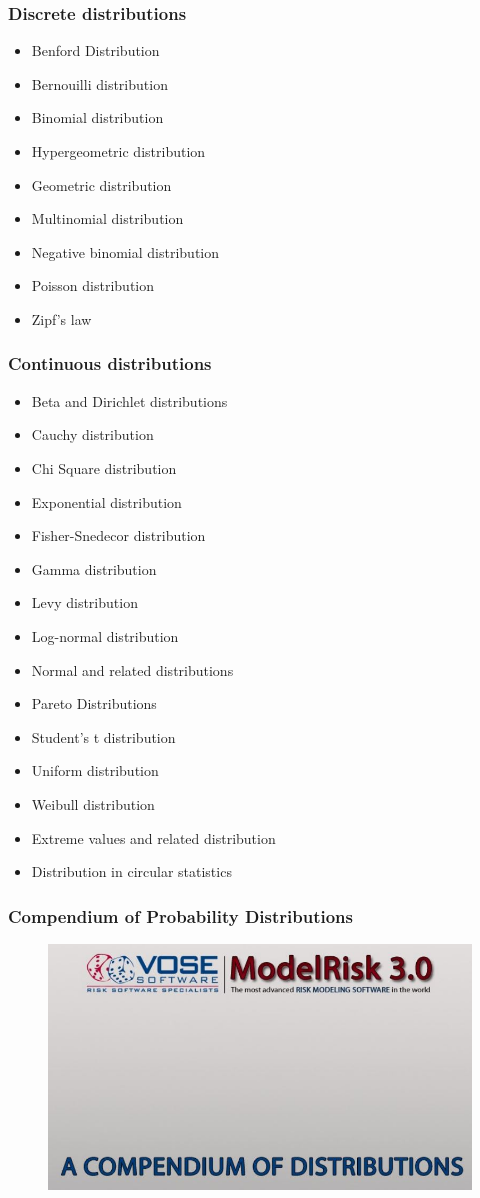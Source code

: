 \documentclass[MAIN.tex]{subfiles}
\begin{document}
 
\begin{frame}
	\frametitle{Discrete distributions}
\begin{itemize}
\item Benford Distribution
\item Bernouilli distribution
\item Binomial distribution
\item Hypergeometric distribution
\item Geometric distribution
\item Multinomial distribution
\item Negative binomial distribution
\item Poisson distribution
\item Zipf's law
\end{itemize}
\end{frame}
\begin{frame}
\frametitle{Continuous distributions}
\begin{itemize}
\item Beta and Dirichlet distributions
\item Cauchy distribution
\item Chi Square distribution
\item Exponential distribution
\item Fisher-Snedecor distribution
\item Gamma distribution
\item Levy distribution
\item Log-normal distribution
\item Normal and related distributions
\item Pareto Distributions
\item Student's t distribution
\item Uniform distribution
\item Weibull distribution
\item Extreme values and related distribution
\item Distribution in circular statistics
\end{itemize}
\end{frame}
\begin{frame}
\frametitle{Compendium of Probability Distributions}
\begin{figure}
\centering
\includegraphics[width=1.05\linewidth]{images/vosecompendium}
\end{figure}
\end{frame}
\end{document}
